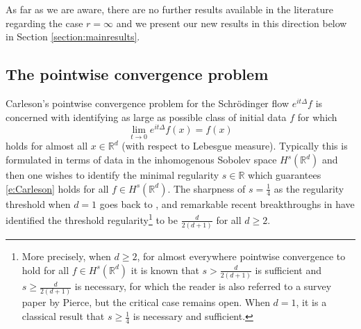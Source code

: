 \documentclass[a4paper]{amsart}
\numberwithin{equation}{section}%
\theoremstyle{plain}%
\theoremstyle{definition}
\theoremstyle{remark}%
\begin{document}
As far as we are aware, there are no further results available in the literature regarding the case $r = \infty$ and we present our new results in this direction below in Section \ref{section:mainresults}. 


\subsection{The pointwise convergence problem}

Carleson's pointwise convergence problem for the Schr\"odinger flow $e^{it\Delta}f$ is concerned with identifying as large as possible class of initial data $f$ for which 
\begin{equation} \label{e:Carleson}
\lim_{t \to 0} e^{it\Delta}f(x) = f(x)
\end{equation}
holds for almost all $x \in \mathbb{R}^d$ (with respect to Lebesgue measure). Typically this is formulated in terms of data in the inhomogenous Sobolev space $H^s(\mathbb{R}^d)$ and then one wishes to identify the minimal regularity $s \in \mathbb{R}$ which guarantees \eqref{e:Carleson} holds for all $f \in H^s(\mathbb{R}^d)$. The sharpness of $s = \frac{1}{4}$ as the regularity threshold when $d = 1$ goes back to \cite{Carleson, DK}, and remarkable recent breakthroughs in \cite{Bourgain, DuGuthLi, DuZhang} have identified the threshold regularity\footnote{More precisely, when $d \geq 2$, for almost everywhere pointwise convergence to hold for all $f \in H^s(\mathbb{R}^d)$ it is known that $s > \frac{d}{2(d + 1)}$ is sufficient and $s \geq \frac{d}{2(d + 1)}$ is necessary, for which the reader is also referred to a survey paper \cite{Pr20} by Pierce, but the critical case remains open. When $d = 1$, it is a classical result that $s \geq \frac{1}{4}$ is necessary and sufficient.} to be $\frac{d}{2(d+1)}$ for all $d \geq 2$.
\end{document}
